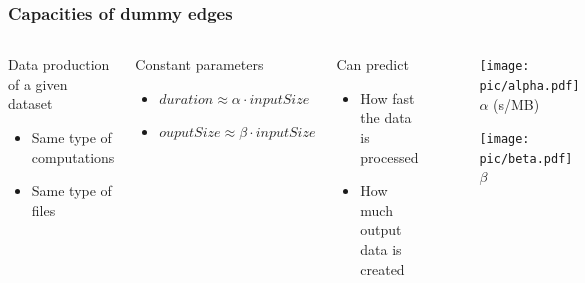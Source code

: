 \documentclass{beamer}
\begin{document}
\begin{frame}\frametitle{Capacities of dummy edges}
\begin{columns}[c]
\begin{block}{Data production of a given dataset}
  \begin{itemize}
    \item Same type of computations
    \item Same type of files 
  \end{itemize}
\end{block}

\begin{block}{Constant parameters}
  \begin{itemize}
    \item $duration \approx \alpha \cdot inputSize $
    \item $ouputSize \approx \beta \cdot  inputSize $ 
  \end{itemize}
\end{block}

\begin{block}{Can predict}
  \begin{itemize}
    \item How fast the data is processed
    \item How much output data is created
  \end{itemize}
\end{block}

\begin{scriptsize}
\vspace{-6mm}
\begin{figure}[h]
	\begin{center}
		\texttt{[image: pic/alpha.pdf]}
		\vspace{-1mm}
	\\{$\alpha$ (s/MB)}	
	\end{center}
\end{figure} 
\vspace{-8mm}
\begin{figure}[h]
	\begin{center}
		\texttt{[image: pic/beta.pdf]}
		\vspace{-2mm}
		\\{$\beta$}
	\end{center}
\end{figure} 
\end{scriptsize}
\end{columns}

\end{frame}
\end{document}
